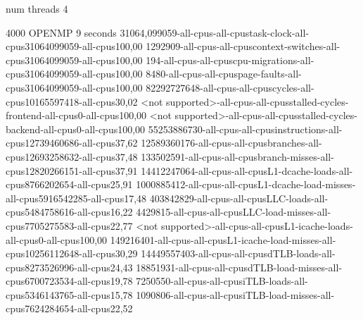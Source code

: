 num threads 4

4000
OPENMP
9 seconds
31064,099059-all-cpus-all-cpustask-clock-all-cpus31064099059-all-cpus100,00
1292909-all-cpus-all-cpuscontext-switches-all-cpus31064099059-all-cpus100,00
194-all-cpus-all-cpuscpu-migrations-all-cpus31064099059-all-cpus100,00
8480-all-cpus-all-cpuspage-faults-all-cpus31064099059-all-cpus100,00
82292727648-all-cpus-all-cpuscycles-all-cpus10165597418-all-cpus30,02
<not supported>-all-cpus-all-cpusstalled-cycles-frontend-all-cpus0-all-cpus100,00
<not supported>-all-cpus-all-cpusstalled-cycles-backend-all-cpus0-all-cpus100,00
55253886730-all-cpus-all-cpusinstructions-all-cpus12739460686-all-cpus37,62
12589360176-all-cpus-all-cpusbranches-all-cpus12693258632-all-cpus37,48
133502591-all-cpus-all-cpusbranch-misses-all-cpus12820266151-all-cpus37,91
14412247064-all-cpus-all-cpusL1-dcache-loads-all-cpus8766202654-all-cpus25,91
1000885412-all-cpus-all-cpusL1-dcache-load-misses-all-cpus5916542285-all-cpus17,48
403842829-all-cpus-all-cpusLLC-loads-all-cpus5484758616-all-cpus16,22
4429815-all-cpus-all-cpusLLC-load-misses-all-cpus7705275583-all-cpus22,77
<not supported>-all-cpus-all-cpusL1-icache-loads-all-cpus0-all-cpus100,00
149216401-all-cpus-all-cpusL1-icache-load-misses-all-cpus10256112648-all-cpus30,29
14449557403-all-cpus-all-cpusdTLB-loads-all-cpus8273526996-all-cpus24,43
18851931-all-cpus-all-cpusdTLB-load-misses-all-cpus6700723534-all-cpus19,78
7250550-all-cpus-all-cpusiTLB-loads-all-cpus5346143765-all-cpus15,78
1090806-all-cpus-all-cpusiTLB-load-misses-all-cpus7624284654-all-cpus22,52
